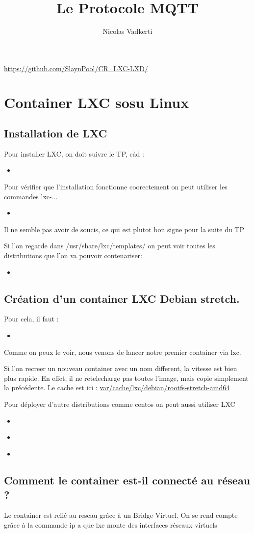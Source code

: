 \documentclass[10pt,a4paper]{article}
\title{Le Protocole MQTT}
\author{Nicolas Vadkerti}
\newcommand{\insertcode}[2]{\begin{itemize}\item[]\end{itemize}}
\begin{document}
\maketitle


\url{https://github.com/SlaynPool/CR_LXC-LXD/}

\section {Container LXC sosu Linux}
\subsection{Installation de LXC}
Pour installer LXC, on doit suivre le TP, càd :
\insertcode{commande/1.txt}{Installation de LXC}

 Pour vérifier que l'installation fonctionne coorectement on peut utiliser les commandes lxc-...
 \insertcode{commande/2.txt}{Verification de LXC}
 Il ne semble pas avoir de soucis, ce qui est plutot bon signe pour la suite du TP 

 Si l'on regarde dans /usr/share/lxc/templates/ on peut voir toutes les distributions que l'on va pouvoir contenariser:
 \insertcode{commande/3.txt}{listes des distributions contenarisables}
 
 
 \subsection{Création d’un container LXC Debian stretch.}
 
 
 Pour cela, il faut :
 \insertcode{commande/4.txt}{premier container}
 Comme on peux le voir, nous venons de lancer notre premier container via lxc.
 
 Si l'on recreer un nouveau container avec un nom different, la vitesse est bien plus rapide. En effet, il ne retelecharge pas toutes l'image, mais copie simplement la précédente. Le cache est ici : \url{var/cache/lxc/debian/rootfs-stretch-amd64}
 
 
 Pour déployer d'autre distributions comme centos on peut aussi utiliser LXC
 \insertcode{commande/5.txt}{LXC centos}
 


\insertcode{commande/6.txt}{Les commandes utiles }

\insertcode{commande/7.txt}{Les commandes utiles}
\subsection{Comment le container est-il connecté au réseau ? }
Le container est relié au reseau grâce à un Bridge Virtuel.
On se rend compte grâce à la commande ip a que lxc monte des interfaces réseaux virtuels 
\end{document}
